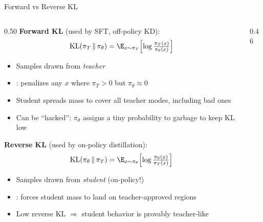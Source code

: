 \begin{frame}{Forward vs Reverse KL}
  \begin{columns}[T]
    \begin{column}{0.50\textwidth}
      \textbf{Forward KL} (used by SFT, off-policy KD):
      \[
        \mathrm{KL}(\pi_T \,\Vert\, \pi_\theta) = \E_{x \sim \pi_T}\!\left[\log\tfrac{\pi_T(x)}{\pi_\theta(x)}\right]
      \]
      \begin{itemize}[nosep]
        \item Samples drawn from \emph{teacher}
        \item {}: penalizes any $x$ where $\pi_T > 0$ but $\pi_\theta \approx 0$
        \item Student spreads mass to cover all teacher modes, including bad ones
        \item Can be ``hacked'': $\pi_\theta$ assigns a tiny probability to garbage to keep KL low
      \end{itemize}

      \vspace{0.4em}
      \textbf{Reverse KL} (used by on-policy distillation):
      \[
        \mathrm{KL}(\pi_\theta \,\Vert\, \pi_T) = \E_{x \sim \pi_\theta}\!\left[\log\tfrac{\pi_\theta(x)}{\pi_T(x)}\right]
      \]
      \begin{itemize}[nosep]
        \item Samples drawn from \emph{student} (on-policy!)
        \item {}: forces student mass to land on teacher-approved regions
        \item Low reverse KL $\Rightarrow$ student behavior is provably teacher-like
      \end{itemize}
    \end{column}
    \begin{column}{0.46\textwidth}
      \centering


\end{column}
\end{columns}
\end{frame}
